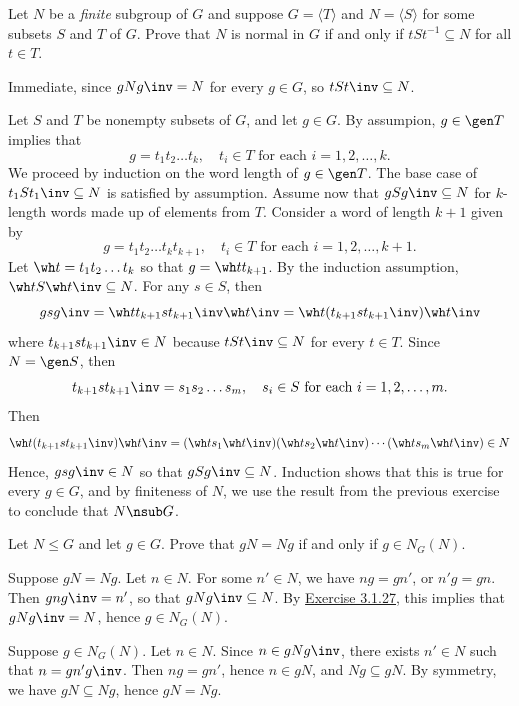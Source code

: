 \begin{exercise}\label{ex3.1.29}
    Let $N$ be a \emph{finite} subgroup of $G$ and suppose $G = \langle T \rangle$ and $N = \langle S \rangle$ for some subsets $S$ and $T$ of $G$. Prove that $N$ is normal in $G$ if and only if $tSt^{-1} \subseteq N$ for all $t \in T$.
\end{exercise}

\begin{solitem}
    \item [\rightimp] Immediate, since $gNg\inv = N$ for every $g \in G$, so $tSt\inv \subseteq N$.
    \item [\leftimp] Let $S$ and $T$ be nonempty subsets of $G$, and let $g \in G$. By assumpion, $g \in \gen T$ implies that
    \[g = t_1t_2 \dots t_k, \quad t_i \in T \text{ for each } i = 1, 2, \ldots, k.\]
    We proceed by induction on the word length of $g \in \gen T$. The base case of $t_1St_1\inv \subseteq N$ is satisfied by assumption. Assume now that $gSg\inv \subseteq N$ for $k$-length words made up of elements from $T$. Consider a word of length $k + 1$ given by 
    \[g = t_1t_2 \ldots t_kt_{k + 1}, \quad t_i \in T \text{ for each } i = 1, 2, \ldots, k + 1.\]
    Let $\wh t = t_1t_2 \ldots t_k$ so that $g = \wh tt_{k + 1}$. By the induction assumption, $\wh tS\wh t\inv \subseteq N$. For any $s \in S$, then 
    \[gsg\inv = \wh tt_{k + 1}st_{k + 1}\inv \wh t\inv = \wh t(t_{k + 1}st_{k + 1}\inv)\wh t\inv\]
    where $t_{k + 1}st_{k + 1}\inv \in N$ because $tSt\inv \subseteq N$ for every $t \in T$. Since $N = \gen S$, then
    \[t_{k + 1}st_{k + 1}\inv = s_1s_2 \ldots s_m, \quad s_i \in S \text{ for each } i = 1, 2, \ldots, m.\]
    Then
    \[\wh t(t_{k + 1}st_{k + 1}\inv)\wh t\inv = (\wh ts_1\wh t\inv)(\wh ts_2 \wh t\inv) \cdots (\wh ts_m \wh t\inv) \in N\]
    Hence, $gsg\inv \in N$ so that $gSg\inv \subseteq N$. Induction shows that this is true for every $g \in G$, and by finiteness of $N$, we use the result from the previous exercise to conclude that $N \nsub G$.
\end{solitem}

\begin{exercise}\label{ex3.1.30}
    Let $N \le G$ and let $g \in G$. Prove that $gN = Ng$ if and only if $g \in N_G(N)$.
\end{exercise}

\begin{solitem}
    \item [\rightimp] Suppose $gN = Ng$. Let $n \in N$. For some $n' \in N$, we have $ng = gn'$, or $n'g = gn$. Then $gng\inv = n'$, so that $gNg\inv \subseteq N$. By \hyperref[ex3.1.27]{Exercise 3.1.27}, this implies that $gNg\inv = N$, hence $g \in N_G(N)$.
    \item [\leftimp] Suppose $g \in N_G(N)$. Let $n \in N$. Since $n \in gNg\inv$, there exists $n' \in N$ such that $n = gn'g\inv$. Then $ng = gn'$, hence $n \in gN$, and $Ng \subseteq gN$. By symmetry, we have $gN \subseteq Ng$, hence $gN = Ng$.
\end{solitem}

